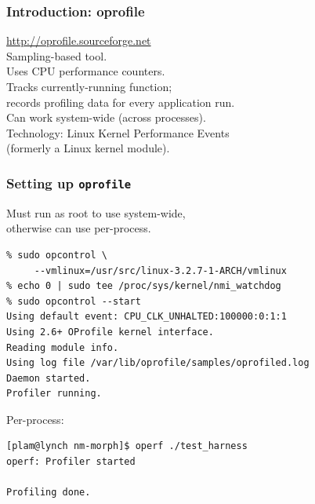 \begin{frame}
  \frametitle{Introduction: oprofile}


\begin{changemargin}{1.5cm}

    \url{http://oprofile.sourceforge.net}\\[1em]

    Sampling-based tool.\\[1em]
    
    Uses CPU performance counters.\\[1em]

    Tracks currently-running function;\\
    records profiling data for every application run.\\[1em]

    Can work system-wide (across processes).\\[1em]

    Technology: Linux Kernel Performance Events\\ (formerly a Linux kernel module).
    \end{changemargin}
\end{frame}

\begin{frame}[fragile]
  \frametitle{Setting up {\tt oprofile}}


\begin{changemargin}{1.5cm}

  Must run as root to use system-wide, \\
otherwise can use per-process.

  \begin{lstlisting}
% sudo opcontrol \
     --vmlinux=/usr/src/linux-3.2.7-1-ARCH/vmlinux
% echo 0 | sudo tee /proc/sys/kernel/nmi_watchdog
% sudo opcontrol --start
Using default event: CPU_CLK_UNHALTED:100000:0:1:1
Using 2.6+ OProfile kernel interface.
Reading module info.
Using log file /var/lib/oprofile/samples/oprofiled.log
Daemon started.
Profiler running.
  \end{lstlisting}

  Per-process:
\begin{lstlisting}
[plam@lynch nm-morph]$ operf ./test_harness
operf: Profiler started

Profiling done.
\end{lstlisting}%
\end{changemargin}

\end{frame}

